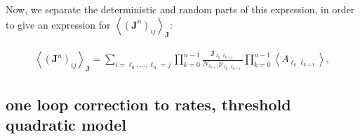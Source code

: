 \documentclass [12pt]{amsart}
\newcommand{\matr}[1]{\mathbf{#1}} %
\newcommand\abk[1]{\left\langle #1 \right\rangle}
\theoremstyle{definition}
\begin{document}
Now, we separate the deterministic and random parts of this expression, in order to give an expression for  $\abk{(\matr J^n)_{ij}}_{\matr J}$:

\begin{align*}
\abk{(\matr J^n)_{ij}}_{\matr J} =  \sum_{i = \ell_0, \ldots, \ell_n = j} \prod_{k = 0}^{n-1} \frac{\overline{\matr J_{\ell_k \ell_{k+1}}}}{N_{\ell_{k+1}}  p_{\ell_{k}\ell_{k+1}}}\prod_{k = 0}^{n-1}\abk{A_{\ell_{k}\ell_{k+1}}},
\end{align*}





\subsection{one loop correction to rates, threshold quadratic model}





\end{document}
